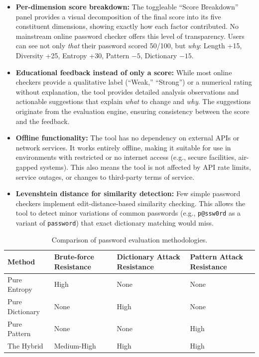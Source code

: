 \begin{itemize}
    \item \textbf{Per-dimension score breakdown:} The toggleable ``Score Breakdown'' panel provides a visual decomposition of the final score into its five constituent dimensions, showing exactly how each factor contributed. No mainstream online password checker offers this level of transparency. Users can see not only \textit{that} their password scored 50/100, but \textit{why}: Length +15, Diversity +25, Entropy +30, Pattern $-5$, Dictionary $-15$.

    \item \textbf{Educational feedback instead of only a score:} While most online checkers provide a qualitative label (``Weak,'' ``Strong'') or a numerical rating without explanation, the tool provides detailed analysis observations and actionable suggestions that explain \textit{what} to change and \textit{why}. The suggestions originate from the evaluation engine, ensuring consistency between the score and the feedback.

    \item \textbf{Offline functionality:} The tool has no dependency on external APIs or network services. It works entirely offline, making it suitable for use in environments with restricted or no internet access (e.g., secure facilities, air-gapped systems). This also means the tool is not affected by API rate limits, service outages, or changes to third-party terms of service.

    \item \textbf{Levenshtein distance for similarity detection:} Few simple password checkers implement edit-distance-based similarity checking. This allows the tool to detect minor variations of common passwords (e.g., \texttt{p@ssw0rd} as a variant of \texttt{password}) that exact dictionary matching would miss.
\end{itemize}

\begin{table}[H]
\centering
\caption{Comparison of password evaluation methodologies.}
\label{tab:methodology}
\small
\begin{tabularx}{\textwidth}{>{\raggedright\arraybackslash}p{3cm} >{\centering\arraybackslash}p{2.5cm} >{\centering\arraybackslash}p{2.5cm} >{\centering\arraybackslash}p{2.5cm}}
\toprule
\textbf{Method} & \textbf{Brute-force Resistance} & \textbf{Dictionary Attack Resistance} & \textbf{Pattern Attack Resistance} \\
\midrule
Pure Entropy & High & None & None \\
Pure Dictionary & None & High & None \\
Pure Pattern & None & None & High \\
The Hybrid & Medium-High & High & High \\
\bottomrule
\end{tabularx}
\end{table}

